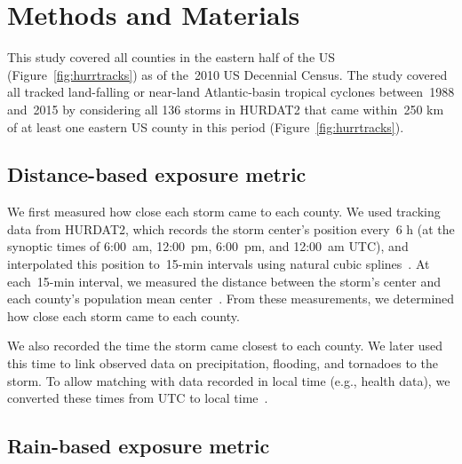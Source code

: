 \section*{Methods and Materials}

This study covered all counties in the eastern half of the \ac{US}
(Figure~\ref{fig:hurrtracks}) as of the~2010 \ac{US} Decennial Census. The
study covered all tracked land-falling or near-land Atlantic-basin tropical
cyclones between~1988 and~2015 by considering all 136 storms in \ac{HURDAT2}
\parencite{landsea2013} that came within~250 \si{\kilo\metre} of at least one
eastern \ac{US} county in this period (Figure~\ref{fig:hurrtracks}). 

\subsection*{Distance-based exposure metric}

We first measured how close each storm came to each county. We used tracking
data from \ac{HURDAT2}, which records the storm center's position every~6
\si{\hour} (at the synoptic times of 6:00~am, 12:00~pm, 6:00~pm, and 12:00~am
\ac{UTC}), and interpolated this position to~15-\si{\minute} intervals using
natural cubic splines~\parencite{hurricaneexposure}. At each~15-\si{\minute}
interval, we measured the distance between the storm's center and each county's
population mean center~\parencite{bivand2013applied, countycenters}. From these
measurements, we determined how close each storm came to each county. 

We also recorded the time the storm came closest to each county. We later used
this time to link observed data on precipitation, flooding, and tornadoes to
the storm.  To allow matching with data recorded in local time (e.g., health
data), we converted these times from \ac{UTC} to local
time~\parencite{countytimezones}.

\subsection*{Rain-based exposure metric}


